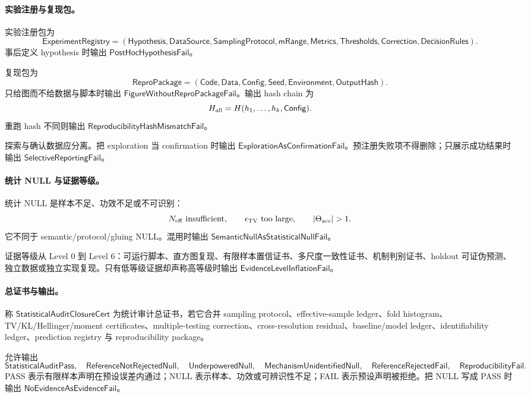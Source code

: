 \paragraph{实验注册与复现包。}
实验注册包为
\[
\boxed{
\mathsf{ExperimentRegistry}
=
(\mathsf{Hypothesis},\mathsf{DataSource},\mathsf{SamplingProtocol},
\mathsf{mRange},\mathsf{Metrics},\mathsf{Thresholds},
\mathsf{Correction},\mathsf{DecisionRules}).
}
\]
事后定义 hypothesis 时输出 \(\mathsf{PostHocHypothesisFail}\)。

复现包为
\[
\boxed{
\mathsf{ReproPackage}
=
(\mathsf{Code},\mathsf{Data},\mathsf{Config},\mathsf{Seed},
\mathsf{Environment},\mathsf{OutputHash}).
}
\]
只给图而不给数据与脚本时输出 \(\mathsf{FigureWithoutReproPackageFail}\)。输出 hash chain 为
\[
H_{\rm all}=H(h_1,\ldots,h_k,\mathsf{Config}).
\]
重跑 hash 不同则输出 \(\mathsf{ReproducibilityHashMismatchFail}\)。

探索与确认数据应分离。把 exploration 当 confirmation 时输出 \(\mathsf{ExplorationAsConfirmationFail}\)。预注册失败项不得删除；只展示成功结果时输出 \(\mathsf{SelectiveReportingFail}\)。

\paragraph{统计 NULL 与证据等级。}
统计 NULL 是样本不足、功效不足或不可识别：
\[
N_{\rm eff}\ {\rm insufficient},\qquad
\epsilon_{\rm TV}\ {\rm too\ large},\qquad
|\Theta_{\rm acc}|>1.
\]
它不同于 semantic/protocol/gluing NULL。混用时输出 \(\mathsf{SemanticNullAsStatisticalNullFail}\)。

证据等级从 Level 0 到 Level 6：可运行脚本、直方图复现、有限样本置信证书、多尺度一致性证书、机制判别证书、holdout 可证伪预测、独立数据或独立实现复现。只有低等级证据却声称高等级时输出 \(\mathsf{EvidenceLevelInflationFail}\)。

\paragraph{总证书与输出。}
称 \(\mathsf{StatisticalAuditClosureCert}\) 为统计审计总证书，若它合并 sampling protocol、effective-sample ledger、fold histogram、TV/KL/Hellinger/moment certificates、multiple-testing correction、cross-resolution residual、baseline/model ledger、identifiability ledger、prediction registry 与 reproducibility package。

允许输出
\[
\mathsf{StatisticalAuditPass},\quad
\mathsf{ReferenceNotRejectedNull},\quad
\mathsf{UnderpoweredNull},\quad
\mathsf{MechanismUnidentifiedNull},\quad
\mathsf{ReferenceRejectedFail},\quad
\mathsf{ReproducibilityFail}.
\]
PASS 表示有限样本声明在预设误差内通过；NULL 表示样本、功效或可辨识性不足；FAIL 表示预设声明被拒绝。把 NULL 写成 PASS 时输出 \(\mathsf{NoEvidenceAsEvidenceFail}\)。

